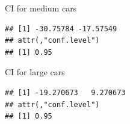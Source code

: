 \documentclass[ignorenonframetext,]{beamer}
\newenvironment{Shaded}{\begin{snugshade}}{\end{snugshade}}
\newcommand{\DataTypeTok}[1]{\textcolor[rgb]{0.13,0.29,0.53}{#1}}
\newcommand{\KeywordTok}[1]{\textcolor[rgb]{0.13,0.29,0.53}{\textbf{#1}}}
\newcommand{\NormalTok}[1]{#1}
\newcommand{\OperatorTok}[1]{\textcolor[rgb]{0.81,0.36,0.00}{\textbf{#1}}}
\newcommand{\StringTok}[1]{\textcolor[rgb]{0.31,0.60,0.02}{#1}}
\begin{document}
\begin{frame}[fragile]{CI for medium cars}
\protect\hypertarget{ci-for-medium-cars}{}

\begin{Shaded}
\end{Shaded}

\begin{verbatim}
## [1] -30.75784 -17.57549
## attr(,"conf.level")
## [1] 0.95
\end{verbatim}

\end{frame}

\begin{frame}[fragile]{CI for large cars}
\protect\hypertarget{ci-for-large-cars}{}

\begin{Shaded}
\end{Shaded}

\begin{verbatim}
## [1] -19.270673   9.270673
## attr(,"conf.level")
## [1] 0.95
\end{verbatim}

\end{frame}
\end{document}
